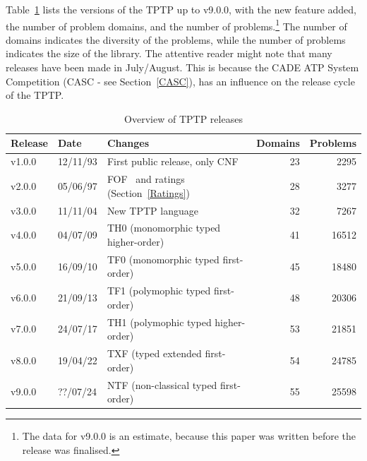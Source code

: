\documentclass{easychair}
\begin{document}
Table~\ref{tab:Releases} lists the versions of the TPTP up to v9.0.0, with the new feature added, 
the number of problem domains, and the number of problems.\footnote{%
The data for v9.0.0 is an estimate, because this paper was written before the release was
finalised.}
The number of domains indicates the diversity of the problems, while the number of problems 
indicates the size of the library.
The attentive reader might note that many releases have been made in July/August.
This is because the CADE ATP System Competition (CASC - see Section~\ref{CASC}), has an 
influence on the release cycle of the TPTP. 

\begin{table}[htb]
\begin{center}
\setlength{\tabcolsep}{4pt}
\begin{tabular}{ll|l|rr}
Release & Date     & Changes                                              & Domains & Problems \\
\hline
v1.0.0  & 12/11/93 & First public release, only CNF~\cite{SS98-JAR}       &      23 &     2295 \\
v2.0.0  & 05/06/97 & FOF~\cite{Sut09} and ratings (Section~\ref{Ratings}) &      28 &     3277 \\
v3.0.0  & 11/11/04 & New TPTP language~\cite{SS+06}                       &      32 &     7267 \\
v4.0.0  & 04/07/09 & TH0 (monomorphic typed higher-order)~\cite{SB10}     &      41 &    16512 \\
v5.0.0  & 16/09/10 & TF0 (monomorphic typed first-order)~\cite{SS+12}     &      45 &    18480 \\
v6.0.0  & 21/09/13 & TF1 (polymophic typed first-order)~\cite{BP13-TFF1}  &      48 &    20306 \\
v7.0.0  & 24/07/17 & TH1 (polymophic typed higher-order)~\cite{KSR16}     &      53 &    21851 \\
v8.0.0  & 19/04/22 & TXF (typed extended first-order)~\cite{SK18}         &      54 &    24785 \\
v9.0.0  & ??/07/24 & NTF (non-classical typed first-order)~\cite{SF+22}   &      55 &    25598 \\
\end{tabular}
\end{center}
\caption{Overview of TPTP releases}
\label{tab:Releases}
\end{table}
\end{document}

